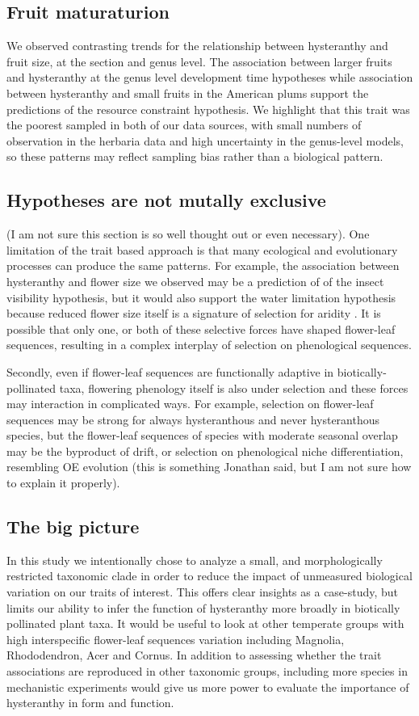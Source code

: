 \documentclass{article}[11pt]
\begin{document}
\subsection{Fruit maturaturion}
We observed contrasting trends for the relationship between  hysteranthy and fruit size, at the section and genus level. The association between larger fruits and hysteranthy  at the genus level development time hypotheses while association between hysteranthy and small fruits in the American plums support the predictions of the resource constraint hypothesis. We highlight that this trait was the poorest sampled in both of our data sources, with small numbers of observation in the herbaria data and high uncertainty in the genus-level models, so these patterns may reflect sampling bias rather than a biological pattern.


\subsection{Hypotheses are not mutally exclusive}
(I am not sure this section is so well thought out or even necessary). One limitation of the trait based approach is that many ecological and evolutionary processes can produce the same patterns. For example, the association between hysteranthy and flower size we observed may be a prediction of of the insect visibility hypothesis, but it would also support the water limitation hypothesis because reduced flower size itself is a signature of selection for aridity \citep{Teixido:2016aa,Lambrecht:2013aa}. It is possible that only one, or both of these selective forces have shaped flower-leaf sequences, resulting in a complex interplay of selection on phenological sequences.

Secondly, even if flower-leaf sequences are functionally adaptive in biotically-pollinated taxa, flowering phenology itself is also under selection and these forces may interaction in complicated ways. For example, selection on flower-leaf sequences may be strong for always hysteranthous and never hysteranthous species, but the flower-leaf sequences of species with moderate seasonal overlap may be the byproduct of drift, or selection on phenological niche differentiation, resembling OE evolution (this is something Jonathan said, but I am not sure how to explain it properly). 

\subsection{The big picture}
In this study we intentionally chose to analyze a small, and morphologically restricted taxonomic clade in order to reduce the impact of unmeasured biological variation on our traits of interest. This offers clear insights as a case-study, but limits our ability to infer the function of hysteranthy more broadly in biotically pollinated plant taxa. It would be useful to look at other temperate  groups with high interspecific flower-leaf sequences variation including Magnolia, Rhododendron, Acer and Cornus. In addition to assessing whether the trait associations are reproduced in other taxonomic groups, including more species in mechanistic experiments would give us more power to evaluate the importance of hysteranthy in form and function.
\end{document}
